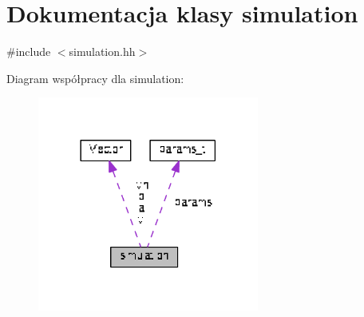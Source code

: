 \hypertarget{classsimulation}{}\section{Dokumentacja klasy simulation}
\label{classsimulation}


{\ttfamily \#include $<$simulation.\+hh$>$}



Diagram współpracy dla simulation\+:\nopagebreak
\begin{figure}[H]
\begin{center}
\leavevmode
\includegraphics[width=206pt]{classsimulation__coll__graph}
\end{center}
\end{figure}
